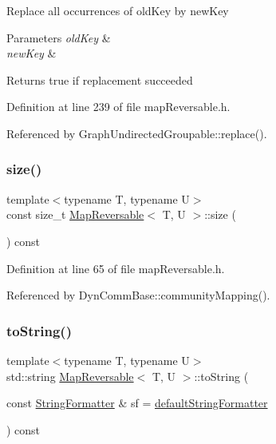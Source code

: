 Replace all occurrences of old\+Key by new\+Key 
\begin{DoxyParams}{Parameters}
{\em old\+Key} & \\
\hline
{\em new\+Key} & \\
\hline
\end{DoxyParams}
\begin{DoxyReturn}{Returns}
true if replacement succeeded 
\end{DoxyReturn}


Definition at line 239 of file map\+Reversable.\+h.



Referenced by Graph\+Undirected\+Groupable\+::replace().

\mbox{\label{classMapReversable_aa21253c86298f61a18c215c7d4e8c048}} 
\subsubsection{\texorpdfstring{size()}{size()}}
{\footnotesize\ttfamily template$<$typename T, typename U$>$ \\
const size\+\_\+t \hyperlink{classMapReversable}{Map\+Reversable}$<$ T, U $>$\+::size (\begin{DoxyParamCaption}{ }\end{DoxyParamCaption}) const\hspace{0.3cm}{\ttfamily [inline]}}



Definition at line 65 of file map\+Reversable.\+h.



Referenced by Dyn\+Comm\+Base\+::community\+Mapping().

\mbox{\label{classMapReversable_a840df7e42bccf937f4d369e2006f3c15}} 
\subsubsection{\texorpdfstring{to\+String()}{toString()}}
{\footnotesize\ttfamily template$<$typename T, typename U$>$ \\
std\+::string \hyperlink{classMapReversable}{Map\+Reversable}$<$ T, U $>$\+::to\+String (\begin{DoxyParamCaption}\item[{const \hyperlink{classStringFormatter}{String\+Formatter} \&}]{sf = {\ttfamily \hyperlink{stringFormatter_8h_abf1349c8e24162d0134072aff288f2a2}{default\+String\+Formatter}} }\end{DoxyParamCaption}) const\hspace{0.3cm}{\ttfamily [inline]}}

